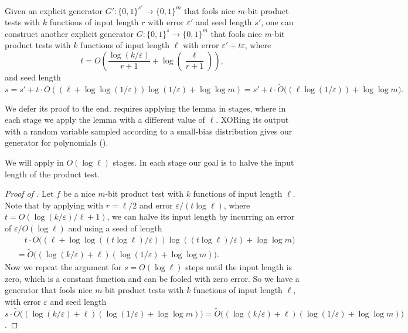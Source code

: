 \documentclass{toc}
\newcommand{\zo}{\{0,1\}}
\def\eps{\varepsilon}
\def\Blocklength{\ell}
\begin{document}
  \begin{lemma} \label{lemma-input-length-reduction}
    Given an explicit generator $G'\colon \zo^{s'} \to \zo^m$ that fools nice 
    $m$-bit %
    product tests with $k$ functions of input length $r$ with error $\eps'$ and seed length $s'$, one can construct another explicit generator $G\colon \zo^s \to \zo^m$ that fools nice 
    $m$-bit %
    product tests with $k$ functions of input length $\Blocklength$ with error $\eps' + t \eps$, where
    \[
      t = O \left( \frac{\log(k/\eps)}{r+1} + \log\left(\frac{\Blocklength}{r+1}\right) \right),
    \]
    and seed length
    \[
      s = s' + t \cdot O ((\Blocklength + \log\log(1/\eps)) \log(1/\eps) + \log\log m) = s' + t \cdot \tilde O\bigl( (\Blocklength \log(1/\eps)) + \log\log m \bigr).
      \]
  \end{lemma}
	We defer its proof to the end.
	 requires applying the lemma in stages, where in each stage we apply the lemma with a different value of $\Blocklength$.
	XORing its output with a random variable sampled according to a small-bias distribution gives our generator for polynomials ().
  
	We will apply  in $O(\log \Blocklength)$ stages.
	In each stage our goal is to halve the input length of the product test.
	
  \begin{proof}[Proof of {}]
    Let $f$ be a nice 
    $m$-bit %
    product test with $k$ functions of input length $\Blocklength$.
Note that by applying  with $r =
\Blocklength/2$ and error $\eps / (t \log \Blocklength)$, where $t = O(\log(k/\eps)/\Blocklength + 1)$, we can halve its
input length by incurring an error of $\eps / O(\log \Blocklength)$ and using a seed of
length
    \begin{align*}
      &\quad t \cdot O \bigl( (\Blocklength + \log\log((t \log \Blocklength)/\eps)) \log ((t \log \Blocklength) / \eps) + \log\log m \bigr) \\
      &= \tilde O \bigl( (\log(k/\eps) + \Blocklength) (\log(1/\eps) + \log\log m) \bigr).
    \end{align*}
    Now we repeat the argument for $s = O(\log \Blocklength)$ steps until the input length is zero, which is a constant function and can be fooled with zero error.
    So we have a generator that fools nice 
    $m$-bit %
    product tests with $k$ functions of input length $\Blocklength$, with error $\eps$ and seed length $s \cdot \tilde O \bigl( (\log(k/\eps) + \Blocklength) (\log(1/\eps) + \log\log m) \bigr) = \tilde O \bigl( (\log(k/\eps) + \Blocklength) (\log(1/\eps) + \log\log m) \bigr)$.
  \end{proof}
\end{document}
